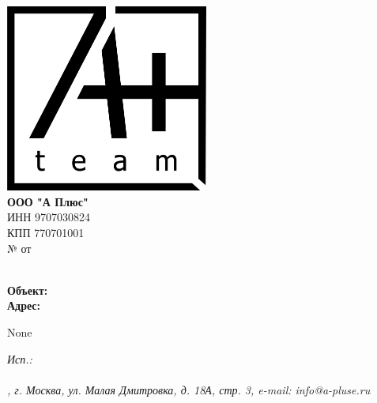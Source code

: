 \documentclass[a4paper,12pt]{letter}
\begin{document}
\noindent
\begin{minipage}[t]{0.5\textwidth}
    \vspace{0pt} %
    \includegraphics[width=0.5\textwidth]{A.png} \\ %
    \textbf{ООО "А Плюс"} \\
    ИНН 9707030824 \\
    КПП 770701001 \\
    № \textbf{  } от \textbf{  } \\
\end{minipage}%

\begin{minipage}[t]{0.5\textwidth} 
    \textbf{} \\
    \textbf{Объект:}  \\
    \textbf{Адрес:} 
\end{minipage}%
\begin{minipage}[t]{0.5\textwidth}
    \raggedleft
    \bfseries
    
\end{minipage}

\vspace{1cm}

\begin{center}
    \textbf{  }
\end{center}


\vspace{0.5cm}

\begin{minipage}[t]{\textwidth}
    \raggedright
    None

\end{minipage}

\vspace{1cm}


\begin{minipage}[t]{0.4\textwidth}
    \textbf{  }
\end{minipage}%
\begin{minipage}[t]{0.2\textwidth}
    \centering
    \underline{\hspace{5cm}}
\end{minipage}%
\begin{minipage}[t]{0.4\textwidth}
    \raggedleft
    \textbf{  }
\end{minipage}


\vfill

\noindent
\itshape
Исп.:  \\
 \\


\noindent\makebox[\linewidth]{\rule{1\paperwidth}{0.4pt}}
\noindent
\centering
\fontsize{9}{10}, г. Москва, ул. Малая Дмитровка, д. 18А, стр. 3, e-mail: info@a-pluse.ru
\end{document}
